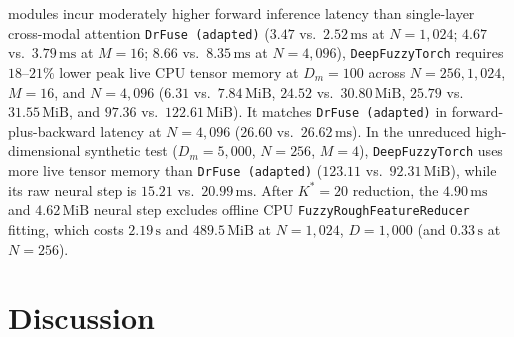 \documentclass[10pt,twocolumn]{article}
\begin{document}
modules incur moderately higher forward inference latency than single-layer cross-modal
attention \texttt{DrFuse (adapted)} ($3.47$ vs.\ $2.52\,\text{ms}$ at $N=1,024$; $4.67$ vs.\
$3.79\,\text{ms}$ at $M=16$; $8.66$ vs.\ $8.35\,\text{ms}$ at $N=4,096$),
\texttt{DeepFuzzyTorch} requires $18\text{--}21\%$ lower peak live CPU tensor memory at
$D_m=100$ across $N=256, 1,024$, $M=16$, and $N=4,096$ ($6.31$ vs.\ $7.84\,\text{MiB}$,
$24.52$ vs.\ $30.80\,\text{MiB}$, $25.79$ vs.\ $31.55\,\text{MiB}$, and $97.36$ vs.\
$122.61\,\text{MiB}$). It matches \texttt{DrFuse (adapted)} in forward-plus-backward latency at
$N=4,096$ ($26.60$ vs.\ $26.62\,\text{ms}$). In the unreduced high-dimensional synthetic test
($D_m=5,000$, $N=256$, $M=4$), \texttt{DeepFuzzyTorch} uses more live tensor memory than
\texttt{DrFuse (adapted)} ($123.11$ vs.\ $92.31\,\text{MiB}$), while its raw neural step is
$15.21$ vs.\ $20.99\,\text{ms}$. After $K^*=20$ reduction, the $4.90\,\text{ms}$ and
$4.62\,\text{MiB}$ neural step excludes offline CPU \texttt{FuzzyRoughFeatureReducer} fitting,
which costs $2.19\,\text{s}$ and $489.5\,\text{MiB}$ at $N=1,024$, $D=1,000$ (and
$0.33\,\text{s}$ at $N=256$).


\FloatBarrier
\section{Discussion}
\label{sec:discussion}
\end{document}
